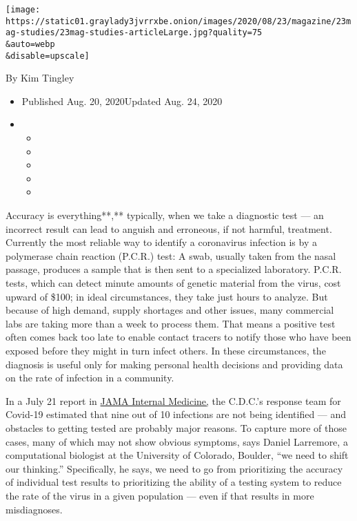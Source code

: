 \texttt{[image: https://static01.graylady3jvrrxbe.onion/images/2020/08/23/magazine/23mag-studies/23mag-studies-articleLarge.jpg?quality=75\\\&auto=webp\\\&disable=upscale]}

By Kim Tingley

\begin{itemize}
\item
  Published Aug. 20, 2020Updated Aug. 24, 2020
\item
  \begin{itemize}
  \item
  \item
  \item
  \item
  \item
  \end{itemize}
\end{itemize}

Accuracy is everything**,** typically, when we take a diagnostic test
--- an incorrect result can lead to anguish and erroneous, if not
harmful, treatment. Currently the most reliable way to identify a
coronavirus infection is by a polymerase chain reaction (P.C.R.) test: A
swab, usually taken from the nasal passage, produces a sample that is
then sent to a specialized laboratory. P.C.R. tests, which can detect
minute amounts of genetic material from the virus, cost upward of \$100;
in ideal circumstances, they take just hours to analyze. But because of
high demand, supply shortages and other issues, many commercial labs are
taking more than a week to process them. That means a positive test
often comes back too late to enable contact tracers to notify those who
have been exposed before they might in turn infect others. In these
circumstances, the diagnosis is useful only for making personal health
decisions and providing data on the rate of infection in a community.

In a July 21 report in
\href{https://jamanetwork.com/journals/jamainternalmedicine/fullarticle/2768834}{JAMA
Internal Medicine,} the C.D.C.'s response team for Covid-19 estimated
that nine out of 10 infections are not being identified --- and
obstacles to getting tested are probably major reasons. To capture more
of those cases, many of which may not show obvious symptoms, says Daniel
Larremore, a computational biologist at the University of Colorado,
Boulder, ``we need to shift our thinking.'' Specifically, he says, we
need to go from prioritizing the accuracy of individual test results to
prioritizing the ability of a testing system to reduce the rate of the
virus in a given population --- even if that results in more
misdiagnoses.

